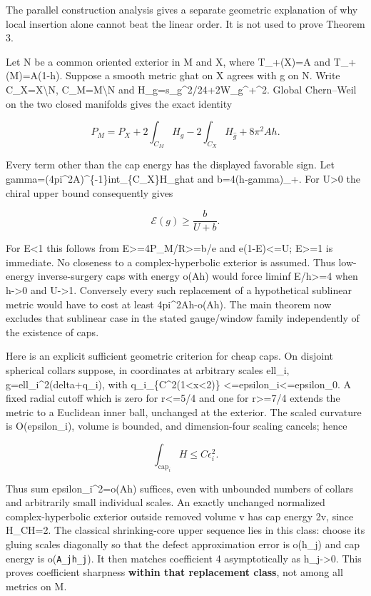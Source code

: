 \documentclass[
  10pt,
]{article}
\begin{document}
The parallel construction analysis gives a separate geometric
explanation of why local insertion alone cannot beat the linear order.
It is not used to prove Theorem 3.

Let N be a common oriented exterior in M and X, where T\_+(X)=A and
T\_+(M)=A(1-h). Suppose a smooth metric ghat on X agrees with g on N.
Write C\_X=X\textbackslash N, C\_M=M\textbackslash N and
H\_g=s\_g\^{}2/24+2\textbar W\_g\^{}+\textbar\^{}2. Global Chern--Weil
on the two closed manifolds gives the exact identity

\[
 P_M=P_X+2\int_{C_M}H_g-2\int_{C_X}H_{\widehat g}
                              +8\pi^2Ah.             \tag{6.1}
\]

Every term other than the cap energy has the displayed favorable sign.
Let gamma=(4pi\^{}2A)\^{}\{-1\}int\_\{C\_X\}H\_ghat and b=4(h-gamma)\_+.
For U\textgreater0 the chiral upper bound consequently gives

\[
                         \mathcal E(g)\ge\frac b{U+b}.
                                                               \tag{6.2}
\]

For E\textless1 this follows from E\textgreater=4P\_M/R\textgreater=b/e
and e(1-E)\textless=U; E\textgreater=1 is immediate. No closeness to a
complex-hyperbolic exterior is assumed. Thus low-energy inverse-surgery
caps with energy o(Ah) would force liminf E/h\textgreater=4 when
h-\textgreater0 and U-\textgreater1. Conversely every such replacement
of a hypothetical sublinear metric would have to cost at least
4pi\^{}2Ah-o(Ah). The main theorem now excludes that sublinear case in
the stated gauge/window family independently of the existence of caps.

Here is an explicit sufficient geometric criterion for cheap caps. On
disjoint spherical collars suppose, in coordinates at arbitrary scales
ell\_i, g=ell\_i\^{}2(delta+q\_i), with
\textbar\textbar q\_i\textbar\textbar\_\{C\^{}2(1\textless\textbar x\textbar\textless2)\}
\textless=epsilon\_i\textless=epsilon\_0. A fixed radial cutoff which is
zero for r\textless=5/4 and one for r\textgreater=7/4 extends the metric
to a Euclidean inner ball, unchanged at the exterior. The scaled
curvature is O(epsilon\_i), volume is bounded, and dimension-four
scaling cancels; hence

\[
                         \int_{\mathrm{cap}_i}H\le C\epsilon_i^2.
                                                               \tag{6.3}
\]

Thus sum epsilon\_i\^{}2=o(Ah) suffices, even with unbounded numbers of
collars and arbitrarily small individual scales. An exactly unchanged
normalized complex-hyperbolic exterior outside removed volume v has cap
energy 2v, since H\_CH=2. The classical shrinking-core upper sequence
lies in this class: choose its gluing scales diagonally so that the
defect approximation error is o(h\_j) and cap energy is o(\nolinkurl{A_jh_j}). It
then matches coefficient 4 asymptotically as h\_j-\textgreater0. This
proves coefficient sharpness \textbf{within that replacement class}, not
among all metrics on M.
\end{document}

